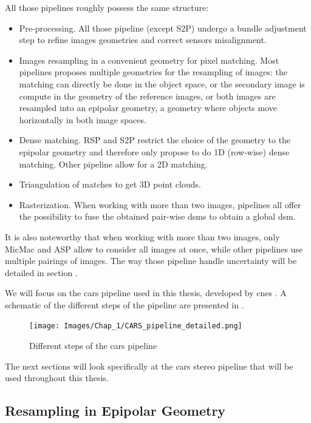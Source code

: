 All those pipelines roughly possess the same structure:
\begin{itemize}
    \item Pre-processing. All those pipeline (except S2P) undergo a bundle adjustment step to refine images geometries and correct sensors misalignment.
    \item Images resampling in a convenient geometry for pixel matching. Most pipelines proposes multiple geometries for the resampling of images: the matching can directly be done in the object space, or the secondary image is compute in the geometry of the reference images, or both images are resampled into an epipolar geometry, \ie a geometry where objects move horizontally in both image spaces.
    \item Dense matching. RSP and S2P restrict the choice of the geometry to the epipolar geometry and therefore only propose to do 1D (row-wise) dense matching. Other pipeline allow for a 2D matching.
    \item Triangulation of matches to get 3D point clouds.
    \item Rasterization. When working with more than two images, pipelines all offer the possibility to fuse the obtained pair-wise \acrshort{dsm}s to obtain a global \acrshort{dsm}.
\end{itemize}
It is also noteworthy that when working with more than two images, only MicMac and ASP allow to consider all images at once, while other pipelines use multiple pairings of images. The way those pipeline handle uncertainty will be detailed in section .

We will focus on the \acrshort{cars} pipeline used in this thesis, developed by \acrshort{cnes} \cite{michel_new_2020}. A schematic of the different steps of the pipeline are presented in .

\begin{figure}
    \centering
    \texttt{[image: Images/Chap\_1/CARS\_pipeline\_detailed.png]}
    \caption{Different steps of the \acrshort{cars} pipeline}
    \label{fig:cars_pipeline}
\end{figure}

The next sections will look specifically at the \acrshort{cars} stereo pipeline that will be used throughout this thesis.

\subsection{Resampling in Epipolar Geometry}\label{sec:epipolar_geometry}


